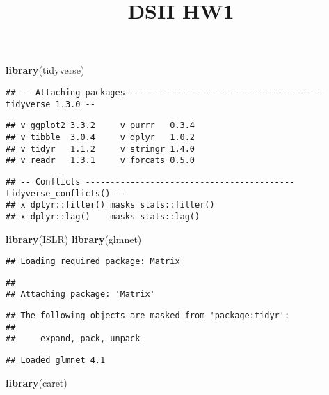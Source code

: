 \documentclass[
]{article}
\title{DSII HW1}
\author{}
\date{\vspace{-2.5em}}
\newenvironment{Shaded}{\begin{snugshade}}{\end{snugshade}}
\newcommand{\KeywordTok}[1]{\textcolor[rgb]{0.13,0.29,0.53}{\textbf{#1}}}
\newcommand{\NormalTok}[1]{#1}
\begin{document}
\maketitle

\begin{Shaded}
\begin{Highlighting}[]
\KeywordTok{library}\NormalTok{(tidyverse)}
\end{Highlighting}
\end{Shaded}

\begin{verbatim}
## -- Attaching packages --------------------------------------- tidyverse 1.3.0 --
\end{verbatim}

\begin{verbatim}
## v ggplot2 3.3.2     v purrr   0.3.4
## v tibble  3.0.4     v dplyr   1.0.2
## v tidyr   1.1.2     v stringr 1.4.0
## v readr   1.3.1     v forcats 0.5.0
\end{verbatim}

\begin{verbatim}
## -- Conflicts ------------------------------------------ tidyverse_conflicts() --
## x dplyr::filter() masks stats::filter()
## x dplyr::lag()    masks stats::lag()
\end{verbatim}

\begin{Shaded}
\begin{Highlighting}[]
\KeywordTok{library}\NormalTok{(ISLR)}
\KeywordTok{library}\NormalTok{(glmnet)}
\end{Highlighting}
\end{Shaded}

\begin{verbatim}
## Loading required package: Matrix
\end{verbatim}

\begin{verbatim}
## 
## Attaching package: 'Matrix'
\end{verbatim}

\begin{verbatim}
## The following objects are masked from 'package:tidyr':
## 
##     expand, pack, unpack
\end{verbatim}

\begin{verbatim}
## Loaded glmnet 4.1
\end{verbatim}

\begin{Shaded}
\begin{Highlighting}[]
\KeywordTok{library}\NormalTok{(caret)}
\end{Highlighting}
\end{Shaded}
\end{document}
